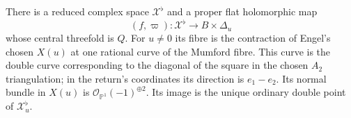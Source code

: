 \begin{theorem}\label{push:src:A.1.2}\label{push:A12}
There is a reduced complex space $\mathcal X^\flat$ and a proper flat
holomorphic map
\[
 (f,\varpi):\mathcal X^\flat\longrightarrow B\times\Delta_u
\]
whose central threefold is $Q$. For $u\ne0$ its fibre is the
contraction of Engel's chosen $X(u)$ at one rational curve of the
Mumford fibre. This curve is the double curve corresponding to the
diagonal of the square in the chosen $A_2$ triangulation; in the
return's coordinates its direction is $e_1-e_2$. Its normal bundle
in $X(u)$ is $\mathcal O_{\mathbb P^1}(-1)^{\oplus2}$. Its image is
the unique ordinary double point of $\mathcal X^\flat_u$.
\end{theorem}

